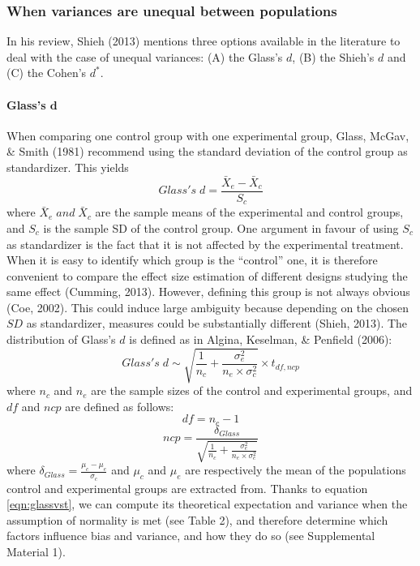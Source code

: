 \documentclass[
  12pt,
  french,
]{article}
\begin{document}
\hypertarget{when-variances-are-unequal-between-populations}{%
\subsubsection{When variances are unequal between
populations}\label{when-variances-are-unequal-between-populations}}

In his review, Shieh (2013) mentions three options available in the
literature to deal with the case of unequal variances: (A) the Glass's
\(d\), (B) the Shieh's \(d\) and (C) the Cohen's \(d^*\).

\hypertarget{glasss-bmd}{%
\paragraph{\texorpdfstring{Glass's
\(\bm{d}\)}{Glass's \textbackslash bm\{d\}}}\label{glasss-bmd}}

When comparing one control group with one experimental group, Glass,
McGav, \& Smith (1981) recommend using the standard deviation of the
control group as standardizer. This yields \begin{equation*} 
Glass's \; d = \frac{\bar{X}_{e} - \bar{X}_{c}}{S_{c}}
\label{eqn:Glassds}
\end{equation*} where \(\bar{X}_{e} \; and \; \bar{X}_{c}\) are the
sample means of the experimental and control groups, and \(S_{c}\) is
the sample SD of the control group. One argument in favour of using
\(S_c\) as standardizer is the fact that it is not affected by the
experimental treatment. When it is easy to identify which group is the
``control'' one, it is therefore convenient to compare the effect size
estimation of different designs studying the same effect (Cumming,
2013). However, defining this group is not always obvious (Coe, 2002).
This could induce large ambiguity because depending on the chosen \(SD\)
as standardizer, measures could be substantially different (Shieh,
2013). The distribution of Glass's \(d\) is defined as in Algina,
Keselman, \& Penfield (2006): \begin{equation} 
Glass's \; d \sim \sqrt{\frac{1}{n_{c}}+\frac{\sigma_{e}^2}{n_{e} \times \sigma^2_{c}}} \times t_{df,ncp}
\label{eqn:glassvst}
\end{equation} where \(n_c\) and \(n_e\) are the sample sizes of the
control and experimental groups, and \(df\) and \(ncp\) are defined as
follows: \begin{equation} 
df = n_{c}-1
\label{eqn:glassdf}
\end{equation} \begin{equation*} 
ncp = \frac{\delta_{Glass}}{\sqrt{\frac{1}{n_{c}} + \frac{\sigma_{e}^2}{n_{e} \times \sigma^2_{c}}}}
\label{eqn:glassncp}
\end{equation*} where
\(\delta_{Glass} = \frac{\mu_{c}-\mu_{e}}{\sigma_{c}}\) and \(\mu_c\)
and \(\mu_e\) are respectively the mean of the populations control and
experimental groups are extracted from. Thanks to equation
\ref{eqn:glassvst}, we can compute its theoretical expectation and
variance when the assumption of normality is met (see Table 2), and
therefore determine which factors influence bias and variance, and how
they do so (see Supplemental Material 1).
\end{document}
